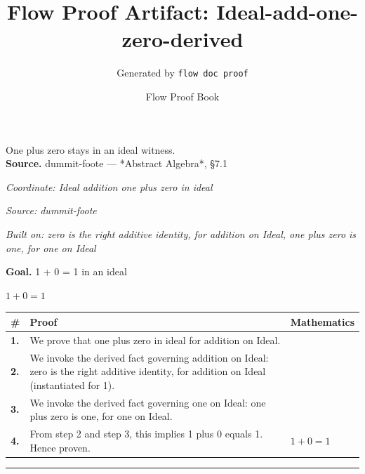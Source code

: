 \documentclass[11pt]{article}
\title{Flow Proof Artifact: Ideal-add-one-zero-derived}
\author{Generated by \texttt{flow doc proof}}
\date{Flow Proof Book}
\theoremstyle{definition}
\begin{document}
\maketitle
One plus zero stays in an ideal witness.\\[0.5em]
\textbf{Source.} dummit-foote — *Abstract Algebra*, §7.1\\[0.5em]
\bigskip
{}\par
\smallskip\noindent\textit{Coordinate: Ideal \cdot addition \cdot one plus zero in ideal}\par
\smallskip\noindent\textit{Source: dummit-foote}\par
\smallskip\noindent\textit{Built on: zero is the right additive identity, for addition on Ideal, one plus zero is one, for one on Ideal}\par
\medskip
\noindent\textbf{Goal.} 1 + 0 = 1 in an ideal\par
\noindent$\displaystyle 1 + 0 = 1$\par
\medskip
\noindent
\begin{tabular}{@{} >{\raggedright\arraybackslash}p{} >{\raggedright\arraybackslash}p{} >{\raggedleft\arraybackslash}p{} @{}}
\textbf{\#} & \textbf{Proof} & \textbf{Mathematics} \\
\midrule
\textbf{1.} & We prove that one plus zero in ideal for addition on Ideal. & \\[0.45em]
\textbf{2.} & We invoke the derived fact governing addition on Ideal: zero is the right additive identity, for addition on Ideal (instantiated for 1). & \\[0.45em]
\textbf{3.} & We invoke the derived fact governing one on Ideal: one plus zero is one, for one on Ideal. & \\[0.45em]
\textbf{4.} & From step 2 and step 3, this implies 1 plus 0 equals 1. Hence proven. & $\displaystyle 1 + 0 = 1$ \\[0.45em]
\bottomrule
\end{tabular}
\label{thm:Ideal-addition-one_plus_zero_in_ideal}
\par\medskip\hrule
\end{document}
